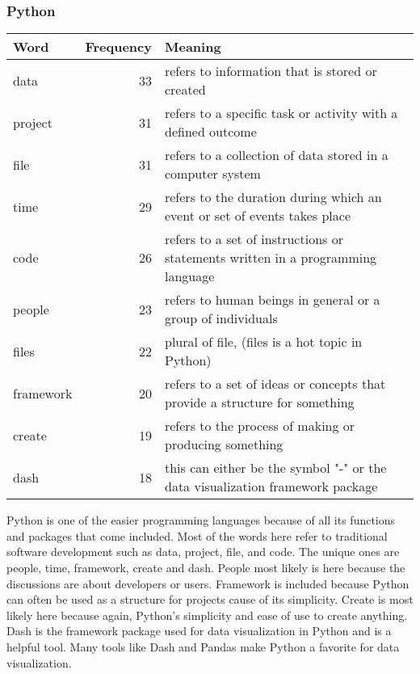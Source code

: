 \documentclass{article}
\theoremstyle{theorem}
\theoremstyle{definition}
\theoremstyle{remark}
\begin{document}
\subsubsection{Python}
\begin{tabular}{ | l | r | p{7cm} | }
\hline
Word & Frequency & Meaning \\
\hline
data & 33 & refers to information that is stored or created \\
\hline
project & 31 & refers to a specific task or activity with a defined outcome \\
\hline
file & 31 & refers to a collection of data stored in a computer system \\
\hline
time & 29 & refers to the duration during which an event or set of events takes place \\
\hline
code & 26 & refers to a set of instructions or statements written in a programming language \\
\hline
people & 23 & refers to human beings in general or a group of individuals \\
\hline
files & 22 & plural of file, (files is a hot topic in Python) \\
\hline
framework & 20 & refers to a set of ideas or concepts that provide a structure for something \\
\hline
create & 19 & refers to the process of making or producing something \\
\hline
dash & 18 & this can either be the symbol "-" or the data visualization framework package \\
\hline
\end{tabular}

\medskip
Python is one of the easier programming languages because of all its functions and packages that come included. Most of the words here refer to traditional software development such as data, project, file, and code. The unique ones are people, time, framework, create and dash. People most likely is here because the discussions are about developers or users. Framework is included because Python can often be used as a structure for projects cause of its simplicity. Create is most likely here because again, Python's simplicity and ease of use to create anything. Dash is the framework package used for data visualization in Python and is a helpful tool. Many tools like Dash and Pandas make Python a favorite for data visualization.
\end{document}
